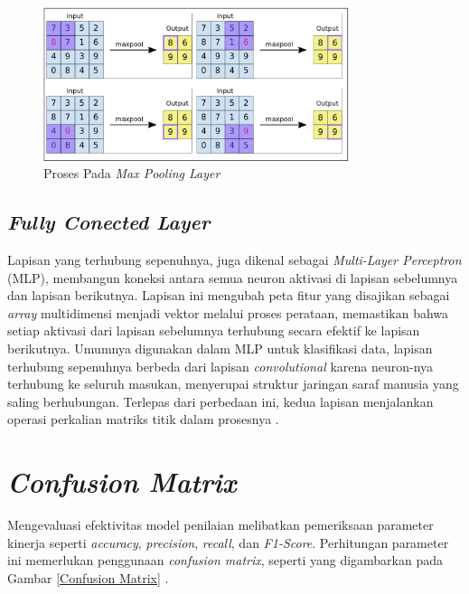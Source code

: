     \begin{figure}[H]
      \centering
      \includegraphics[width=0.80\textwidth]{figures/bab2/pool.png}
      \caption{Proses Pada \textit{Max Pooling Layer} \cite{fiki}}
      \label{Proses Pada Max Pooling Layer}

    
    \end{figure}


\subsection{\textit{Fully Conected Layer}}

    Lapisan yang terhubung sepenuhnya, juga dikenal sebagai \textit{Multi-Layer Perceptron} (MLP), membangun koneksi antara semua neuron aktivasi di lapisan sebelumnya dan lapisan berikutnya. Lapisan ini mengubah peta fitur yang disajikan sebagai \textit{array} multidimensi menjadi vektor melalui proses perataan, memastikan bahwa setiap aktivasi dari lapisan sebelumnya terhubung secara efektif ke lapisan berikutnya. Umumnya digunakan dalam MLP untuk klasifikasi data, lapisan terhubung sepenuhnya berbeda dari lapisan \textit{convolutional} karena neuron-nya terhubung ke seluruh masukan, menyerupai struktur jaringan saraf manusia yang saling berhubungan. Terlepas dari perbedaan ini, kedua lapisan menjalankan operasi perkalian matriks titik dalam prosesnya \cite{Dewi2018}.

    

\section{\textit{Confusion Matrix}}

    Mengevaluasi efektivitas model penilaian melibatkan pemeriksaan parameter kinerja seperti \textit{accuracy}, \textit{precision}, \textit{recall}, dan \textit{F1-Score}. Perhitungan parameter ini memerlukan penggunaan \textit{confusion matrix}, seperti yang digambarkan pada Gambar \ref{Confusion Matrix} \cite{Nurhikmat2018}.

